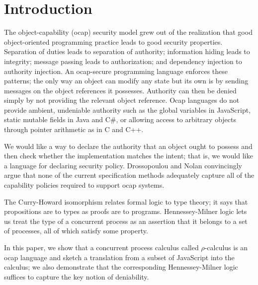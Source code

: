 \documentclass[]{amsart}
\theoremstyle{definition}
\theoremstyle{remark}
\numberwithin{equation}{subsection}
\newcommand{\rhoc}{$\rho$-calculus}
\newcommand{\paperversion}{Draft Version 0.1 - July 19, 2013}
\newenvironment{toc}
{
\begin{list}{}{
   \setlength{\leftmargin}{0.4in}
   \setlength{\rightmargin}{0.6in}
   \setlength{\parskip}{0pt}
 } \item }
{\end{list}}
\begin{document}



\section{Introduction}

The object-capability (ocap) security model grew out of the realization
that good object-oriented programming practice leads to good security properties.
Separation of duties leads to separation of authority; information hiding
leads to integrity; message passing leads to authorization; 
and dependency injection to authority injection.  An
ocap-secure programming language enforces these patterns; the only way an
object can modify any state but its own is by sending messages on the object
references it possesses.  Authority can then be denied simply by not providing
the relevant object reference. Ocap languages do not provide ambient, undeniable 
authority such as the global variables in JavaScript,
static mutable fields in Java and C\#, or allowing access to arbitrary objects
through pointer arithmetic as in C and C++.  

We would like a way to declare the authority that an object ought to
possess and then check whether the implementation matches the intent; that is,
we would like a language for declaring security policy.
Drossopoulou and Nolan \cite{Drossopoulou:2013:NCP:2489804.2489811} convincingly argue that none 
of the current specification methods adequately capture all of the capability 
policies required to support ocap systems.

The Curry-Howard isomorphism relates formal logic to type theory; it says 
that propositions are to types as proofs are to programs.  Hennessey-Milner
logic lets us treat the type of a concurrent process as an assertion that 
it belongs to a set of processes, all of which satisfy some property.  

In this paper, we show that a concurrent process calculus called \rhoc\; is
an ocap language and sketch a translation from a subset of JavaScript into
the calculus; we also demonstrate that the corresponding Hennessey-Milner
logic suffices to capture the key notion of deniability.
\end{document}
